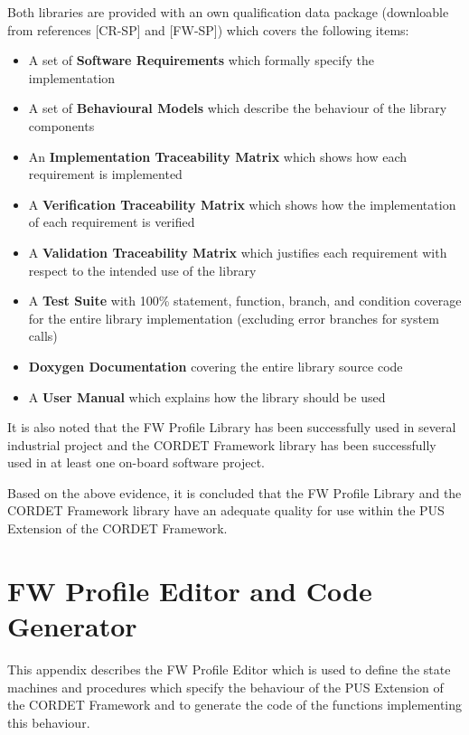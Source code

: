 \documentclass{pnp_article}
\begin{document}
Both libraries are provided with an own qualification data package (downloable from references [CR-SP] and [FW-SP]) which covers the following items:

\begin{itemize}
\item A set of \textbf{Software Requirements} which formally specify the implementation
\item A set of \textbf{Behavioural Models} which describe the behaviour of the library components
\item An \textbf{Implementation Traceability Matrix} which shows how each requirement is implemented
\item A \textbf{Verification Traceability Matrix} which shows how the implementation of each requirement is verified
\item A \textbf{Validation Traceability Matrix} which justifies each requirement with respect to the intended use of the library
\item A \textbf{Test Suite} with 100\% statement, function, branch, and condition coverage for the entire library implementation (excluding error branches for system calls)
\item \textbf{Doxygen Documentation} covering the entire library source code
\item A \textbf{User Manual} which explains how the library should be used
\end{itemize}

It is also noted that the FW Profile Library has been successfully used in several industrial project and the CORDET Framework library has been successfully used in at least one on-board software project.

Based on the above evidence, it is concluded that the FW Profile Library and the CORDET Framework library have an adequate quality for use within the PUS Extension of the CORDET Framework.




\newpage
\appendix
\section{FW Profile Editor and Code Generator}\label{sec:svrFwProfEd}
This appendix describes the FW Profile Editor which is used to define the state machines and procedures which specify the behaviour of the PUS Extension of the CORDET Framework and to generate the code of the functions implementing this behaviour.
\end{document}
